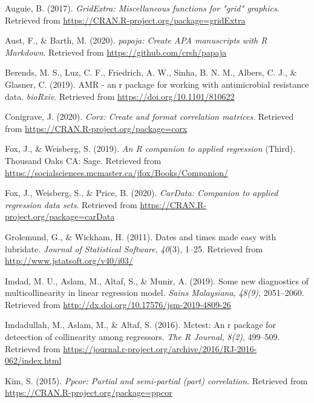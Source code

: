 \documentclass[
  english,
  man,floatsintext]{apa6}
\begin{document}
\begingroup
\setlength{\parindent}{-0.5in}
\setlength{\leftskip}{0.5in}

\hypertarget{refs}{}
\leavevmode\hypertarget{ref-R-gridExtra}{}%
Auguie, B. (2017). \emph{GridExtra: Miscellaneous functions for "grid" graphics}. Retrieved from \url{https://CRAN.R-project.org/package=gridExtra}

\leavevmode\hypertarget{ref-R-papaja}{}%
Aust, F., \& Barth, M. (2020). \emph{papaja: Create APA manuscripts with R Markdown}. Retrieved from \url{https://github.com/crsh/papaja}

\leavevmode\hypertarget{ref-R-AMR}{}%
Berends, M. S., Luz, C. F., Friedrich, A. W., Sinha, B. N. M., Albers, C. J., \& Glasner, C. (2019). AMR - an r package for working with antimicrobial resistance data. \emph{bioRxiv}. Retrieved from \url{https://doi.org/10.1101/810622}

\leavevmode\hypertarget{ref-R-corx}{}%
Conigrave, J. (2020). \emph{Corx: Create and format correlation matrices}. Retrieved from \url{https://CRAN.R-project.org/package=corx}

\leavevmode\hypertarget{ref-R-car}{}%
Fox, J., \& Weisberg, S. (2019). \emph{An R companion to applied regression} (Third). Thousand Oaks CA: Sage. Retrieved from \url{https://socialsciences.mcmaster.ca/jfox/Books/Companion/}

\leavevmode\hypertarget{ref-R-carData}{}%
Fox, J., Weisberg, S., \& Price, B. (2020). \emph{CarData: Companion to applied regression data sets}. Retrieved from \url{https://CRAN.R-project.org/package=carData}

\leavevmode\hypertarget{ref-R-lubridate}{}%
Grolemund, G., \& Wickham, H. (2011). Dates and times made easy with lubridate. \emph{Journal of Statistical Software}, \emph{40}(3), 1--25. Retrieved from \url{http://www.jstatsoft.org/v40/i03/}

\leavevmode\hypertarget{ref-R-mctest_b}{}%
Imdad, M. U., Aslam, M., Altaf, S., \& Munir, A. (2019). Some new diagnostics of multicollinearity in linear regression model. \emph{Sains Malaysiana}, \emph{48(9)}, 2051--2060. Retrieved from \url{http://dx.doi.org/10.17576/jsm-2019-4809-26}

\leavevmode\hypertarget{ref-R-mctest_a}{}%
Imdadullah, M., Aslam, M., \& Altaf, S. (2016). Mctest: An r package for deteection of collinearity among regressors. \emph{The R Journal}, \emph{8(2)}, 499--509. Retrieved from \url{https://journal.r-project.org/archive/2016/RJ-2016-062/index.html}

\leavevmode\hypertarget{ref-R-ppcor}{}%
Kim, S. (2015). \emph{Ppcor: Partial and semi-partial (part) correlation}. Retrieved from \url{https://CRAN.R-project.org/package=ppcor}
\end{document}
